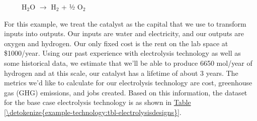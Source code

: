 \documentclass[letterpaper,10pt,english]{sphinxmanual}
\begin{document}
     H$_{\text{2}}$O \(\rightarrow\) H$_{\text{2}}$ + ½ O$_{\text{2}}$

For this example, we treat the catalyst as the capital that we use to transform inputs into outputs. Our inputs are water and electricity, and our outputs are oxygen and hydrogen. Our only fixed cost is the rent on the lab space at \$1000/year. Using our past experience with electrolysis technology as well as some historical data, we estimate that we’ll be able to produce 6650 mol/year of hydrogen and at this scale, our catalyst has a lifetime of about 3 years. The metrics we’d like to calculate for our electrolysis technology are cost, greenhouse gas (GHG) emissions, and jobs created. Based on this information, the  dataset for the base case electrolysis technology is as shown in \hyperref[\detokenize{example-technology:tbl-electrolysisdesigns}]{Table \ref{\detokenize{example-technology:tbl-electrolysisdesigns}}}.
\end{document}
